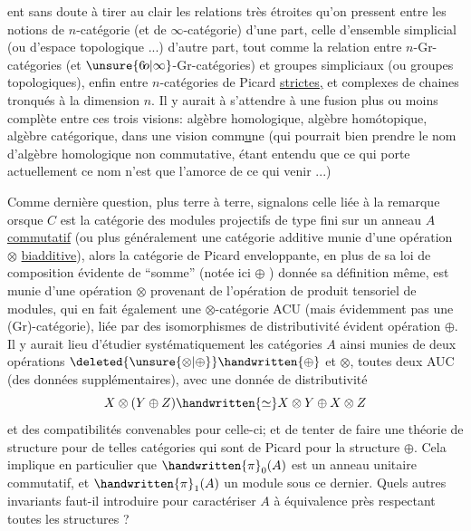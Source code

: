 
ent sans doute à tirer au clair les relations très étroites qu'on pressent entre les notions de $n$-catégorie (et de $\infty$-catégorie) d'une part, celle d'ensemble simplicial (ou d'espace topologique ...) d'autre part, tout comme la relation entre $n$-Gr-catégories (et $\unsure{6\!o|\infty}$-Gr-catégories) et groupes simpliciaux (ou groupes topologiques), enfin entre   $n$-catégories de Picard \uline{strictes,} et  complexes de chaines tronqués à la dimension $n$. Il y aurait à s'attendre à une fusion plus ou moins complète entre ces trois visions: algèbre homologique, algèbre homótopique, algèbre catégorique, dans une vision comm\uline{u}ne (qui pourrait bien prendre le nom d'algèbre homologique non commutative, étant entendu que ce qui porte actuellement ce nom n'est que l'amorce de ce qui   venir ...)

Comme dernière question, plus terre à terre, signalons celle liée à la remarque   orsque  $C$ est la catégorie des modules projectifs de type fini sur un anneau $A$ \uline{commutatif} (ou plus généralement une catégorie additive munie d'une opération $\otimes$   \uline{biadditive}), alors la catégorie de Picard enveloppante, en plus de sa loi de composition évidente de ``somme'' (notée ici $\oplus$ ) donnée   sa définition même, est munie d'une opération $\otimes$ provenant de l'opération de produit tensoriel  de modules, qui en fait également une $\otimes$-catégorie ACU (mais évidemment pas une (Gr)-catégorie), liée par des isomorphismes de distributivité évident   opération $\oplus$. Il y aurait lieu d'étudier systématiquement les catégories $A$ ainsi munies de deux opérations $\deleted{\unsure{\otimes|\oplus}}\handwritten{\oplus}$ et $\otimes$, toutes deux AUC (des données supplémentaires), avec une donnée de distributivité
\[
X\otimes(Y\oplus Z)\handwritten{\simeq}X\otimes Y\oplus X\otimes Z
\]
et des compatibilités convenables pour celle-ci; et de tenter de faire une théorie de structure pour de telles catégories qui sont de  Picard pour la structure $\oplus$. Cela implique en particulier que $\handwritten{\pi}_{0}(A)$ est un anneau unitaire commutatif, et $\handwritten{\pi}_{1}(A)$ un module sous ce dernier. Quels autres invariants faut-il introduire pour caractériser $A$ à équivalence près respectant toutes les structures ?

